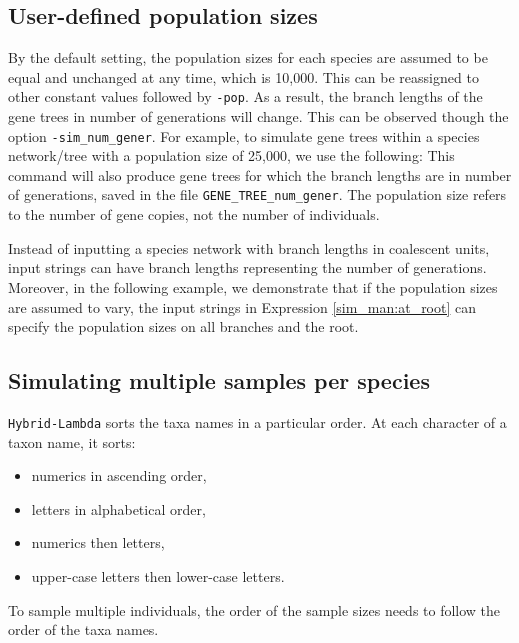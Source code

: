 \subsection{User-defined population sizes}\label{sim_man:pop}
By the default setting, the population sizes for each species are assumed to be equal and unchanged at any time, which is 10,000. This can be reassigned to other constant values followed by {\tt -pop}. As a result, the branch lengths of the gene trees in number of generations will change. This can be observed though the option {\tt -sim\_num\_gener}. For example, to simulate gene trees within a species network/tree with a population size of 25,000,
we use the following:
This command will also produce gene trees for which the branch lengths are in number of generations, saved in the file {\tt GENE\_TREE\_num\_gener}.
\newline{} The population size refers to the number of gene copies, not the number of individuals.

Instead of inputting a species network with branch lengths in coalescent units, input strings can have branch lengths representing the number of generations.
Moreover, in the following example, we demonstrate that if the population sizes are assumed to vary, the input strings in Expression \eqref{sim_man:at_root} can specify the population sizes on all branches and the root.

\subsection{Simulating multiple samples per species}
{\tt Hybrid-Lambda} sorts the taxa names in a particular order. At each character of a taxon name, it sorts:
\begin{itemize}
\item numerics in ascending order,
\item letters in alphabetical order,
\item numerics then letters,
\item upper-case letters then lower-case letters.
\end{itemize}
To sample multiple individuals, the order of the sample sizes needs to follow the order of the taxa names.

